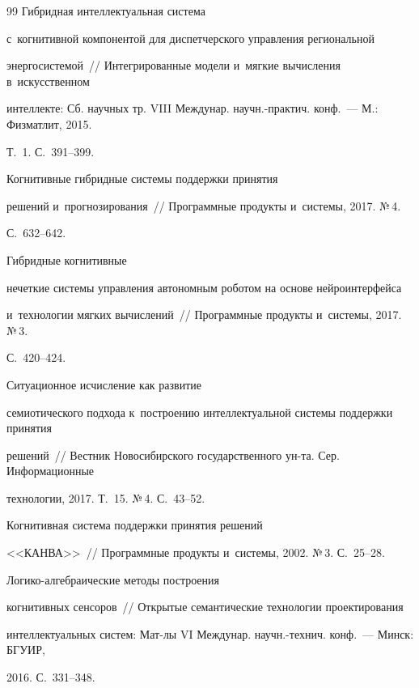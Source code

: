 {{\begin{thebibliography}{99}
   Гибридная интеллектуальная система 


с~когнитивной компонентой для диспетчерского управления региональной 


энергосистемой~/\!\!/ Интегрированные модели и~мягкие вычисления в~искусственном 


интеллекте: Сб. научных тр. VIII Междунар. научн.-практич. конф.~--- М.: Физматлит, 2015. 


Т.~1. С.~391--399.




   Когнитивные гибридные системы поддержки принятия 


решений и~прогнозирования~/\!\!/ Программные продукты и~системы, 2017. №\,4.  


С.~632--642.




   Гибридные когнитивные 


нечеткие системы управления автономным роботом на основе нейроинтерфейса 


и~технологии мягких вычислений~/\!\!/ Программные продукты и~системы, 2017. №\,3.  


С.~420--424.




   Ситуационное исчисление как развитие 


семиотического подхода к~построению интеллектуальной системы поддержки принятия 


решений~/\!\!/ Вестник Новосибирского государственного ун-та. Сер. Информационные 


технологии, 2017. Т.~15. №\,4. С.~43--52.




   Когнитивная система поддержки принятия решений 


<<КАНВА>>~/\!\!/ Программные продукты и~системы, 2002. №\,3. С.~25--28.




   Ло\-ги\-ко-ал\-геб\-ра\-иче\-ские методы построения 


когнитивных сенсоров~/\!\!/ Открытые семантические технологии проектирования 


интеллектуальных систем: Мат-лы VI Междунар. научн.-технич. конф.~--- Минск: БГУИР, 


2016. С.~331--348.


        \end{thebibliography}


} }








